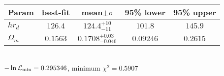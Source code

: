 \begin{tabular}{|l|c|c|c|c|} 
 \hline 
Param & best-fit & mean$\pm\sigma$ & 95\% lower & 95\% upper \\ \hline 
$h r_{{d} }$ &$126.4$ & $124.4_{-11}^{+10}$ & $101.8$ & $145.9$ \\ 
$\Omega_{m }$ &$0.1563$ & $0.1708_{-0.046}^{+0.03}$ & $0.09246$ & $0.2615$ \\ 
\hline 
 \end{tabular} \\ 
$-\ln{\cal L}_\mathrm{min} =0.295346$, minimum $\chi^2=0.5907$ \\ 
